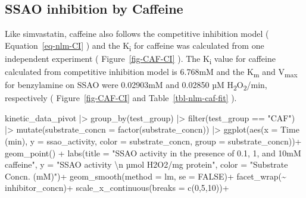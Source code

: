 \documentclass[
  letterpaper,
  DIV=11,
  numbers=noendperiod]{scrreprt}
\newenvironment{Shaded}{\begin{snugshade}}{\end{snugshade}}
\newcommand{\AttributeTok}[1]{\textcolor[rgb]{0.40,0.45,0.13}{#1}}
\newcommand{\ConstantTok}[1]{\textcolor[rgb]{0.56,0.35,0.01}{#1}}
\newcommand{\DecValTok}[1]{\textcolor[rgb]{0.68,0.00,0.00}{#1}}
\newcommand{\FunctionTok}[1]{\textcolor[rgb]{0.28,0.35,0.67}{#1}}
\newcommand{\NormalTok}[1]{\textcolor[rgb]{0.00,0.23,0.31}{#1}}
\newcommand{\SpecialCharTok}[1]{\textcolor[rgb]{0.37,0.37,0.37}{#1}}
\newcommand{\StringTok}[1]{\textcolor[rgb]{0.13,0.47,0.30}{#1}}
\begin{document}
\subsection{SSAO inhibition by
Caffeine}\label{ssao-inhibition-by-caffeine}

Like simvastatin, caffeine also follows the competitive inhibition model
( Equation~\ref{eq-nlm-CI} ) and the K\textsubscript{i} for caffeine was
calculated from one independent experiment ( Figure~\ref{fig-CAF-CI} ).
The K\textsubscript{i} value for caffeine calculated from competitive
inhibition model is 6.768mM and the K\textsubscript{m} and
V\textsubscript{max} for benzylamine on SSAO were 0.02903mM and 0.02850
µM H\textsubscript{2}O\textsubscript{2}/min, respectively (
Figure~\ref{fig-CAF-CI} and Table~\ref{tbl-nlm-caf-fit} ).

\begin{Shaded}
\begin{Highlighting}[]
\NormalTok{kinetic\_data\_pivot }\SpecialCharTok{|\textgreater{}} 
  \FunctionTok{group\_by}\NormalTok{(test\_group) }\SpecialCharTok{|\textgreater{}} 
  \FunctionTok{filter}\NormalTok{(test\_group }\SpecialCharTok{==} \StringTok{"CAF"}\NormalTok{) }\SpecialCharTok{|\textgreater{}} 
  \FunctionTok{mutate}\NormalTok{(}\AttributeTok{substrate\_concn =} \FunctionTok{factor}\NormalTok{(substrate\_concn)) }\SpecialCharTok{|\textgreater{}} 
  \FunctionTok{ggplot}\NormalTok{(}\FunctionTok{aes}\NormalTok{(}\AttributeTok{x =} \StringTok{\textasciigrave{}}\AttributeTok{Time (min)}\StringTok{\textasciigrave{}}\NormalTok{, }
             \AttributeTok{y =}\NormalTok{ ssao\_activity, }
             \AttributeTok{color =}\NormalTok{ substrate\_concn, }
             \AttributeTok{group =}\NormalTok{ substrate\_concn))}\SpecialCharTok{+} 
  \FunctionTok{geom\_point}\NormalTok{() }\SpecialCharTok{+} 
  \FunctionTok{labs}\NormalTok{(}\AttributeTok{title =} \StringTok{"SSAO activity in the presence of 0.1, 1, and 10mM caffeine"}\NormalTok{,}
       \AttributeTok{y =} \StringTok{"SSAO activity }\SpecialCharTok{\textbackslash{}n}\StringTok{ µmol H2O2/mg protein"}\NormalTok{,}
       \AttributeTok{color =} \StringTok{"Substrate Concn. (mM)"}\NormalTok{)}\SpecialCharTok{+}
  \FunctionTok{geom\_smooth}\NormalTok{(}\AttributeTok{method =}\NormalTok{ lm, }\AttributeTok{se =} \ConstantTok{FALSE}\NormalTok{)}\SpecialCharTok{+} 
  \FunctionTok{facet\_wrap}\NormalTok{(}\SpecialCharTok{\textasciitilde{}}\NormalTok{ inhibitor\_concn)}\SpecialCharTok{+}
  \FunctionTok{scale\_x\_continuous}\NormalTok{(}\AttributeTok{breaks =} \FunctionTok{c}\NormalTok{(}\DecValTok{0}\NormalTok{,}\DecValTok{5}\NormalTok{,}\DecValTok{10}\NormalTok{))}\SpecialCharTok{+}

\end{Highlighting}
\end{Shaded}
\end{document}
